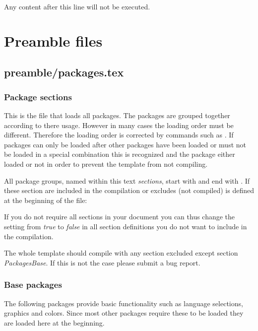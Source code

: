 Any content after this line will not be executed.

\chapter{Preamble files}

\section{preamble/packages.tex}

\subsection{Package sections}

This is the file that loads all packages. The packages are grouped together according to there usage. However in many cases the loading order must be different. Therefore the loading order is corrected by commands such as . If packages can only be loaded after other packages have been loaded or must not be loaded in a special combination this is recognized and the package either loaded or not in order to prevent the template from not compiling. 

All package groups, named within this text \emph{sections}, start with  and end with . If these section are included in the compilation or excludes (not compiled) is defined at the beginning of the file:


If you do not require all sections in your document you can thus change the setting from \emph{true} to \emph{false} in all section definitions you do not want to include in the compilation.

The whole template should compile with any section excluded except section \emph{PackagesBase}. If this is not the case please submit a bug report.

\subsection{Base packages}
\label{sec:packages:base}
The following packages provide basic functionality such as language selections, graphics and colors. Since most other packages require these to be loaded they are loaded here at the beginning. 

